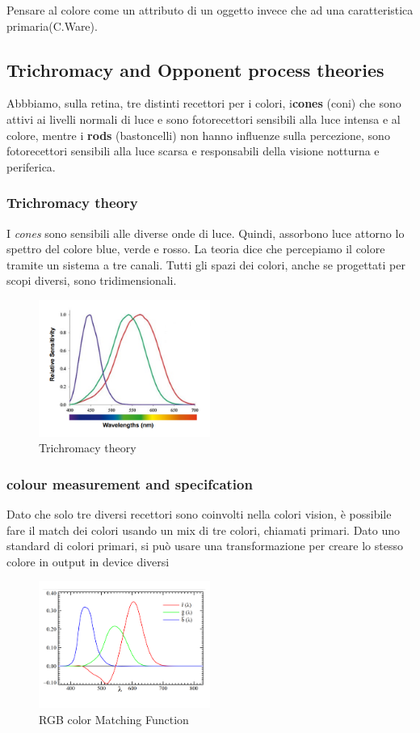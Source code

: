 Pensare al colore come un attributo di un oggetto invece che ad una caratteristica primaria(C.Ware).
\subsection{Trichromacy and Opponent process theories}
Abbbiamo, sulla retina, tre distinti recettori per i colori, i\textbf{cones} (coni) che sono attivi ai livelli normali di luce e sono fotorecettori sensibili alla luce intensa e al colore, mentre i \textbf{rods} (bastoncelli) non hanno influenze sulla percezione, sono fotorecettori sensibili alla luce scarsa e responsabili della visione notturna e periferica.

\subsubsection{Trichromacy theory}
I \textit{cones} sono sensibili alle diverse onde di luce.
Quindi, assorbono luce attorno lo spettro del colore blue, verde e rosso.
La teoria dice che percepiamo il colore tramite un sistema a tre canali.
Tutti gli spazi dei colori, anche se progettati per scopi diversi, sono tridimensionali.
\begin{figure}[H]
    \centering
    \includegraphics[width=0.5\textwidth]{images/Thrichromacy.png} 
    \caption{Trichromacy theory}
    \label{fig:immagine}
\end{figure}
\subsubsection{colour measurement and specifcation}
Dato che solo tre diversi recettori sono coinvolti nella colori vision, è possibile fare il match dei colori
usando un mix di tre colori, chiamati primari.
Dato uno standard di colori primari, si può usare una transformazione per creare lo stesso colore in output in device diversi 
\begin{figure}[H]
    \centering
    \includegraphics[width=0.5\textwidth]{images/RGB.png} 
    \caption{RGB color Matching Function}
    \label{fig:immagine}
\end{figure}
